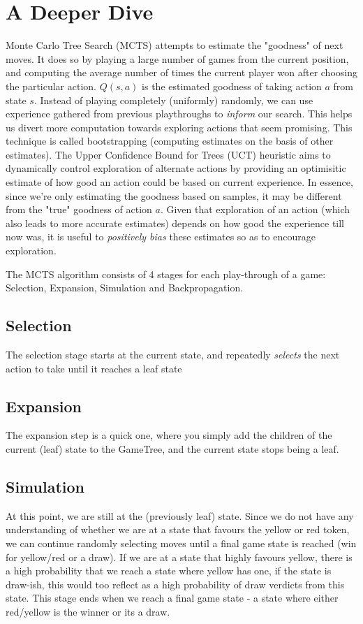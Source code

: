 \documentclass[12pt]{article}
\begin{document}
\section{A Deeper Dive}
Monte Carlo Tree Search (MCTS) attempts to estimate the "goodness" of next moves. It does so by playing a large number of games from the current
position, and computing the average number of times the current player won after choosing the particular action. $Q(s, a)$ is the estimated goodness
of taking action $a$ from state $s$. Instead of playing completely (uniformly) randomly, we can use experience gathered from previous playthroughs to
\emph{inform} our search. This helps us divert more computation towards exploring actions that seem promising. This technique is called bootstrapping
(computing estimates on the basis of other estimates). The Upper Confidence Bound for Trees (UCT) heuristic aims to dynamically control exploration of
alternate actions by providing an optimisitic estimate of how good an action could be based on current experience. In essence, since we're only estimating
the goodness based on samples, it may be different from the "true" goodness of action $a$. Given that exploration of an action (which also leads to more accurate estimates) depends on how good
the experience till now was, it is useful to \emph{positively bias} these estimates so as to encourage exploration.

The MCTS algorithm consists of 4 stages for each play-through of a game: Selection, Expansion, Simulation and Backpropagation.

\subsection{Selection}
The selection stage starts at the current state, and repeatedly \emph{selects} the next action to take until it reaches a leaf state
\subsection{Expansion}
The expansion step is a quick one, where you simply add the children of the current (leaf) state to the GameTree, and the current state stops being
a leaf.
\subsection{Simulation}
At this point, we are still at the (previously leaf) state. Since we do not have any understanding of whether we are at a state that favours the yellow or red token,
we can continue randomly selecting moves until a final game state is reached (win for yellow/red or a draw). If we are at a state that highly favours yellow, there is a high
probability that we reach a state where yellow has one, if the state is draw-ish, this would too reflect as a high probability of draw verdicts from this state.
This stage ends when we reach a final game state - a state where either red/yellow is the winner or its a draw. 
\end{document}

